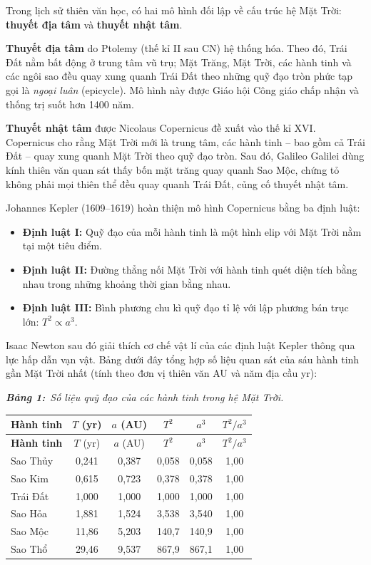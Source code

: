 \documentclass[12pt,a4paper,twoside]{article}
\newcommand{\tablecaption}[2]{%
    \par\vspace{2pt}%
    {\centering\textbf{\textit{Bảng #1:}}~\textit{#2}\par}%
    \vspace{0pt}%
}
\newenvironment{readingpassage}[1][]{%
    \begin{tcolorbox}[enhanced, colback=grayLight, colframe=secondaryBlue,
        coltitle=textDark, fonttitle=\bfseries, title={#1},
        rounded corners, arc=3mm, boxrule=1pt,
        left=15pt, right=15pt, top=10pt, bottom=10pt,
        breakable, before skip=10pt, after skip=10pt, drop fuzzy shadow]
    \setstretch{1.3}
}{\end{tcolorbox}}
\begin{document}
\begin{readingpassage}
Trong lịch sử thiên văn học, có hai mô hình đối lập về cấu trúc hệ Mặt Trời: \textbf{thuyết địa tâm} và \textbf{thuyết nhật tâm}.

\textbf{Thuyết địa tâm} do Ptolemy (thế kỉ II sau CN) hệ thống hóa. Theo đó, Trái Đất nằm bất động ở trung tâm vũ trụ; Mặt Trăng, Mặt Trời, các hành tinh và các ngôi sao đều quay xung quanh Trái Đất theo những quỹ đạo tròn phức tạp gọi là \textit{ngoại luân} (epicycle). Mô hình này được Giáo hội Công giáo chấp nhận và thống trị suốt hơn 1400 năm.

\textbf{Thuyết nhật tâm} được Nicolaus Copernicus đề xuất vào thế kỉ XVI. Copernicus cho rằng Mặt Trời mới là trung tâm, các hành tinh -- bao gồm cả Trái Đất -- quay xung quanh Mặt Trời theo quỹ đạo tròn. Sau đó, Galileo Galilei dùng kính thiên văn quan sát thấy bốn mặt trăng quay quanh Sao Mộc, chứng tỏ không phải mọi thiên thể đều quay quanh Trái Đất, củng cố thuyết nhật tâm.

Johannes Kepler (1609--1619) hoàn thiện mô hình Copernicus bằng ba định luật:
\begin{itemize}[leftmargin=*, itemsep=2pt]
\item \textbf{Định luật I:} Quỹ đạo của mỗi hành tinh là một hình elip với Mặt Trời nằm tại một tiêu điểm.
\item \textbf{Định luật II:} Đường thẳng nối Mặt Trời với hành tinh quét diện tích bằng nhau trong những khoảng thời gian bằng nhau.
\item \textbf{Định luật III:} Bình phương chu kì quỹ đạo tỉ lệ với lập phương bán trục lớn: $T^2 \propto a^3$.
\end{itemize}

Isaac Newton sau đó giải thích cơ chế vật lí của các định luật Kepler thông qua lực hấp dẫn vạn vật. Bảng dưới đây tổng hợp số liệu quan sát của sáu hành tinh gần Mặt Trời nhất (tính theo đơn vị thiên văn AU và năm địa cầu yr):

\vspace{4pt}
\tablecaption{1}{Số liệu quỹ đạo của các hành tinh trong hệ Mặt Trời.}
\renewcommand{\arraystretch}{1.3}
%
\begin{longtable}{|l|c|c|c|c|c|}
\hline
\rowcolor{primaryBlue!10}
\textbf{Hành tinh} & $T$ (yr) & $a$ (AU) & $T^2$ & $a^3$ & $T^2/a^3$ \\
\hline
\endfirsthead
\hline
\rowcolor{primaryBlue!10}
\textbf{Hành tinh} & $T$ (yr) & $a$ (AU) & $T^2$ & $a^3$ & $T^2/a^3$ \\
\hline
\endhead
Sao Thủy & 0{,}241 & 0{,}387 & 0{,}058 & 0{,}058 & 1{,}00 \\
\hline
Sao Kim & 0{,}615 & 0{,}723 & 0{,}378 & 0{,}378 & 1{,}00 \\
\hline
Trái Đất & 1{,}000 & 1{,}000 & 1{,}000 & 1{,}000 & 1{,}00 \\
\hline
Sao Hỏa & 1{,}881 & 1{,}524 & 3{,}538 & 3{,}540 & 1{,}00 \\
\hline
Sao Mộc & 11{,}86 & 5{,}203 & 140{,}7 & 140{,}9 & 1{,}00 \\
\hline
Sao Thổ & 29{,}46 & 9{,}537 & 867{,}9 & 867{,}1 & 1{,}00 \\
\hline
\end{longtable}


\end{readingpassage}
\end{document}
